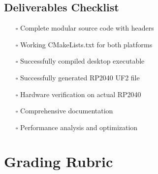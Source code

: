 \documentclass[11pt,a4paper]{article}
\begin{document}
\subsection{Deliverables Checklist}
\begin{itemize}
    \item[$\square$] Complete modular source code with headers
    \item[$\square$] Working CMakeLists.txt for both platforms
    \item[$\square$] Successfully compiled desktop executable
    \item[$\square$] Successfully generated RP2040 UF2 file
    \item[$\square$] Hardware verification on actual RP2040
    \item[$\square$] Comprehensive documentation
    \item[$\square$] Performance analysis and optimization
\end{itemize}

\section{Grading Rubric}
\end{document}
